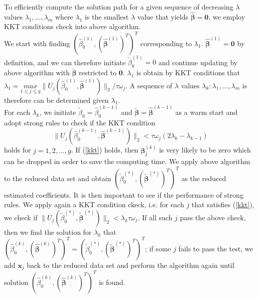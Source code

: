 \documentclass[paper=a4, fontsize=11pt]{scrartcl} %
\begin{document}
To efficiently compute the solution path for a given sequence of decreasing $\lambda$ values ${\lambda_{1},\dots,\lambda_{m}}$ where $\lambda_{1}$ is the smallest $\lambda$ value that yields $\hat{\boldsymbol{\beta}}=\boldsymbol{0}$, we employ KKT conditions check into above algorithm.\\

We start with finding $(\hat{\beta}_{0}^{(1)},(\hat{\boldsymbol{\beta}}^{(1)})^{T})^{T}$ corresponding to $\lambda_{1}$. $\hat{\boldsymbol{\beta}}^{(1)}=\boldsymbol{0}$ by definition, and we can therefore initiate $\tilde{\beta}_{0}^{(1)}=0$ and continue updating by above algorithm with $\breve{\boldsymbol{\beta}}$ restricted to $\boldsymbol{0}$. $\lambda_{1}$ is obtain by KKT conditions that $\lambda_{1}=\underset{1\le j\le g}{max}{\|U_{j}(\hat{\beta}_{0}^{(1)},\hat{\boldsymbol{\beta}}^{(1)})\|_{2}/\tau\omega_{j}}$. A sequence of $\lambda$ values ${\lambda_{k}:\lambda_{1},\dots,\lambda_{m}}$ is therefore can be determined given $\lambda_{1}$.\\

For each $\lambda_{k}$, we initiate $\tilde{\beta}_{0}=\hat{\beta}_{0}^{(k-1)}$ and $\tilde{\boldsymbol{\beta}}=\hat{\boldsymbol{\beta}}^{(k-1)}$ as a warm start and adopt strong rules to check if the KKT condition
\begin{equation}\label{kkt}
\|U_{j}(\hat{\beta}_{0}^{(k-1)},\hat{\boldsymbol{\beta}}^{(k-1)})\|_{2}<\tau\omega_{j}(2\lambda_{k}-\lambda_{k-1})
\end{equation}
holds for $j=1,2,\dots,g$. If (\ref{kkt}) holds, then $\boldsymbol{\beta}_{j}^{(k)}$ is very likely to be zero which can be dropped in order to save the computing time. We apply above algorithm to the reduced data set and obtain $(\tilde{\beta}_{0}^{(*)},(\tilde{\boldsymbol{\beta}}^{(*)})^{T})^{T}$ as the reduced estimated coefficients. It is then important to see if the performance of strong rules. We apply again a KKT condition ckeck, i.e. for each $j$ that satisfies (\ref{kkt}), we check if $\|U_{j}(\tilde{\beta}_{0}^{(*)},\tilde{\boldsymbol{\beta}}^{(*)})\|_{2}<\lambda_{k}\tau\omega_{j}$. If all such $j$ pass the above check, then we find the solution for $\lambda_{k}$ that $(\hat{\beta}_{0}^{(k)},(\hat{\boldsymbol{\beta}}^{(k)})^{T})^{T}=(\tilde{\beta}_{0}^{(*)},(\tilde{\boldsymbol{\beta}}^{(*)})^{T})^{T}$; if some $j$ fails to pass the test, we add $\boldsymbol{x}_{j}$ back to the reduced data set and perform the algorithm again until solution $(\hat{\beta}_{0}^{(k)},(\hat{\boldsymbol{\beta}}^{(k)})^{T})^{T}$ is found.
\end{document}
